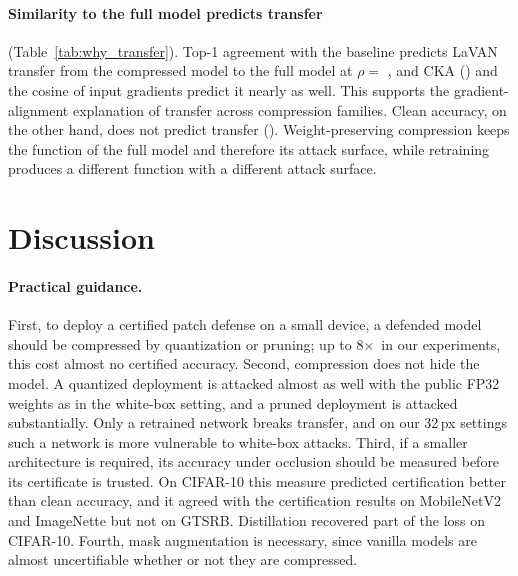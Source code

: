 \documentclass[10pt]{article}
\newcommand{\x}{$\times$}
\begin{document}
\begin{table}[t]
\centering
\caption{Similarity to the full model against transfer on CIFAR-10 (36 compressed models, three seeds). Spearman $\rho$ /
partial $\rho$ given clean accuracy; bold means that the interval excludes zero.}
\label{tab:why_transfer}
\small

\end{table}

\paragraph{Similarity to the full model predicts transfer} (Table~\ref{tab:why_transfer}). Top-1 agreement with the
baseline predicts LaVAN transfer from the compressed model to the full model at $\rho=$
, and CKA () and the cosine of
input gradients predict it nearly as well. This supports the gradient-alignment explanation of transfer
\citep{demontis2019adversarial} across compression families. Clean accuracy, on the other hand, does not predict transfer
(). Weight-preserving compression keeps the function of the full model
and therefore its attack surface, while retraining produces a different function with a different attack surface.

\section{Discussion}
\label{sec:discussion}

\paragraph{Practical guidance.} First, to deploy a certified patch defense on a small device, a defended model should be
compressed by quantization or pruning; up to 8\x\ in our experiments, this cost almost no certified accuracy. Second,
compression does not hide the model. A quantized deployment is attacked almost as well with the public FP32 weights as in
the white-box setting, and a pruned deployment is attacked substantially. Only a retrained network breaks transfer, and on
our 32\,px settings such a network is more vulnerable to white-box attacks. Third, if a smaller architecture is required,
its accuracy under occlusion should be measured before its certificate is trusted. On CIFAR-10 this measure predicted
certification better than clean accuracy, and it agreed with the certification results on MobileNetV2 and ImageNette but
not on GTSRB. Distillation recovered part of the loss on CIFAR-10.
Fourth, mask augmentation is necessary, since vanilla models are almost uncertifiable whether or not they are compressed.
\end{document}
